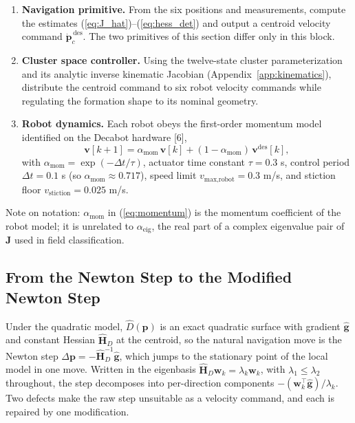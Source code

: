 \documentclass[lettersize,journal]{IEEEtran}
\begin{document}
\begin{enumerate}
    \item \textbf{Navigation primitive.} From the six positions and
          measurements, compute the estimates
          (\ref{eq:J_hat})--(\ref{eq:hess_det}) and output a centroid
          velocity command $\dot{\mathbf{p}}_c^{\,\text{des}}$. The two
          primitives of this section differ only in this block.
    \item \textbf{Cluster space controller.} Using the twelve-state
          cluster parameterization and its analytic inverse kinematic
          Jacobian (Appendix~\ref{app:kinematics}), distribute the
          centroid command to six robot velocity commands while
          regulating the formation shape to its nominal geometry.
    \item \textbf{Robot dynamics.} Each robot obeys the first-order
          momentum model identified on the Decabot hardware [6],
          \begin{equation}
              \mathbf{v}[k+1] = \alpha_{\text{mom}}\,\mathbf{v}[k]
              + (1 - \alpha_{\text{mom}})\,\mathbf{v}^{\text{des}}[k],
              \label{eq:momentum}
          \end{equation}
          with $\alpha_{\text{mom}} = \exp(-\Delta t/\tau)$, actuator
          time constant $\tau = 0.3$ s, control period $\Delta t = 0.1$ s
          (so $\alpha_{\text{mom}} \approx 0.717$), speed limit
          $v_{\text{max,robot}} = 0.3$ m/s, and stiction floor
          $v_{\text{stiction}} = 0.025$ m/s.
\end{enumerate}

Note on notation: $\alpha_{\text{mom}}$ in (\ref{eq:momentum}) is the
momentum coefficient of the robot model; it is unrelated to
$\alpha_{\text{eig}}$, the real part of a complex eigenvalue pair of
$\mathbf{J}$ used in field classification.

\subsection{From the Newton Step to the Modified Newton Step}
\label{sec:mod_newton}

Under the quadratic model, $\hat{D}(\mathbf{p})$ is an exact quadratic
surface with gradient $\hat{\mathbf{g}}$ and constant Hessian
$\hat{\mathbf{H}}_D$ at the centroid, so the natural navigation move is
the Newton step $\Delta\mathbf{p} = -\hat{\mathbf{H}}_D^{-1}
\hat{\mathbf{g}}$, which jumps to the stationary point of the local
model in one move. Written in the eigenbasis
$\hat{\mathbf{H}}_D \mathbf{w}_k = \lambda_k \mathbf{w}_k$, with
$\lambda_1 \leq \lambda_2$ throughout, the step decomposes into
per-direction components $-(\mathbf{w}_k^\top
\hat{\mathbf{g}})/\lambda_k$. Two defects make the raw step unsuitable
as a velocity command, and each is repaired by one modification.
\end{document}
